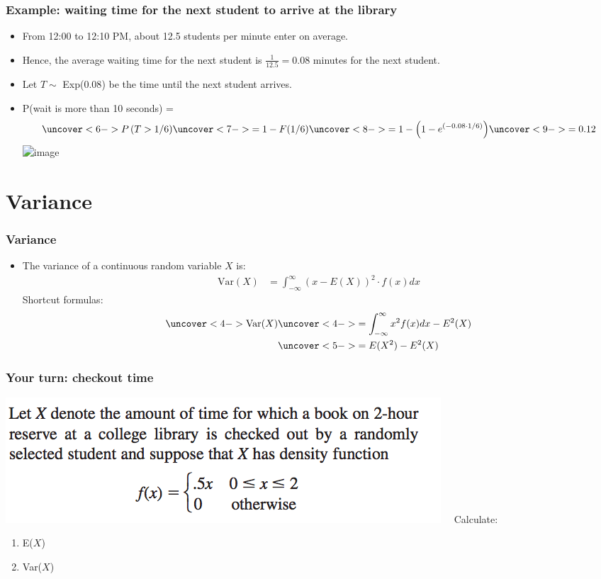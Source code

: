 \documentclass[handout]{beamer}\usepackage{graphicx, color}
\providecommand{\q}{$\quad$ \newline}
\numberwithin{equation}{section}
\begin{document}
\begin{frame}
\frametitle{\small Example: waiting time for the next student to arrive at the library} \scriptsize
\begin{itemize}
\pause \item From 12:00 to 12:10 PM, about 12.5 students per minute enter on average.
\pause \item Hence, the average waiting time for the next student is $\frac{1}{12.5} = 0.08$ minutes for the next student.
\pause \item Let $T \sim $ Exp($0.08$) be the time until the next student arrives.
\pause \item P(wait is more than 10 seconds) = 
\begin{align*}
\uncover<6->{P \left (T > 1/6 \right )} \uncover<7->{= 1 - F(1/6)} \uncover<8->{= 1- \left (1 - e^{(-0.08 \cdot 1/6 )} \right )} \uncover<9->{= 0.12}
\end{align*}
 \includegraphics<10->{../../fig/lib2.png}
\end{itemize}
\end{frame}

\section{Variance}

\begin{frame}
\frametitle{Variance}
\begin{itemize}
\item The variance of a continuous random variable $X$ is:
\pause \begin{align*}
\text{Var}(X) &= \int_{-\infty}^\infty (x - E(X))^2 \cdot f(x) dx 
\end{align*}
\pause Shortcut formulas:
\begin{align*}
\uncover<4->{\text{Var}(X)} & \uncover<4->{= \int_{-\infty}^\infty x^2 f(x) dx - E^2(X)} \\
&\uncover<5->{= E(X^2) - E^2(X)} \\
\end{align*}
\end{itemize}
\end{frame}


\begin{frame}
\frametitle{Your turn: checkout time}
 \includegraphics{../../fig/checkoutpdf.png}\q
Calculate:
\begin{enumerate}
\item E($X$)
\item Var($X$)
\end{enumerate}
\end{frame}
\end{document}
